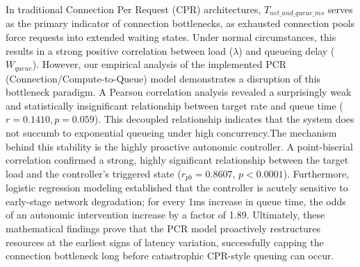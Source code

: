 \documentclass{ieeeaccess}
\begin{document}
\begin{enumerate}
	In traditional Connection Per Request (CPR) architectures, $T_{net\_and\_queue\_ms}$ serves as the primary indicator of connection bottlenecks, as exhausted connection pools force requests into extended waiting states. Under normal circumstances, this results in a strong positive correlation between load ($\lambda$) and queueing delay ($W_{queue}$). However, our empirical analysis of the implemented PCR (Connection/Compute-to-Queue) model demonstrates a disruption of this bottleneck paradigm. A Pearson correlation analysis revealed a surprisingly weak and statistically insignificant relationship between target rate and queue time ($r = 0.1410, p = 0.059$). This decoupled relationship indicates that the system does not succumb to exponential queueing under high concurrency.The mechanism behind this stability is the highly proactive autonomic controller. A point-biserial correlation confirmed a strong, highly significant relationship between the target load and the controller's triggered state ($r_{pb} = 0.8607$, $p < 0.0001$). Furthermore, logistic regression modeling established that the controller is acutely sensitive to early-stage network degradation; for every 1ms increase in queue time, the odds of an autonomic intervention increase by a factor of 1.89. Ultimately, these mathematical findings prove that the PCR model proactively restructures resources at the earliest signs of latency variation, successfully capping the connection bottleneck long before catastrophic CPR-style queuing can occur.
	
\end{enumerate}


\end{document}
